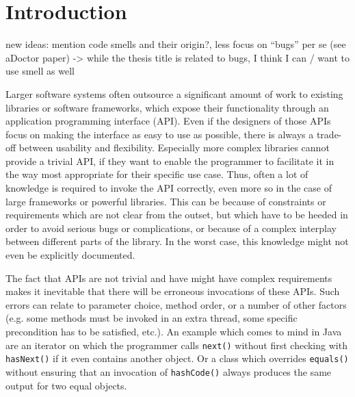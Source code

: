 \chapter{Introduction}\label{chapter:introduction}

new ideas:
    mention code smells and their origin?, less focus on ``bugs'' per se (see aDoctor paper) -> while the thesis title is related to bugs, I think I can / want to use smell as well 

Larger software systems often outsource a significant amount of work to existing libraries or software frameworks, which expose their functionality through an application programming interface (API).
Even if the designers of those APIs focus on making the interface as easy to use as possible, there is always a trade-off between usability and flexibility.
Especially more complex libraries cannot provide a trivial API, if they want to enable the programmer to facilitate it in the way most appropriate for their specific use case.
Thus, often a lot of knowledge is required to invoke the API correctly, even more so in the case of large frameworks or powerful libraries.
This can be because of constraints or requirements which are not clear from the outset, but which have to be heeded in order to avoid serious bugs or complications, or because of a complex interplay between different parts of the library.
In the worst case, this knowledge might not even be explicitly documented.

The fact that APIs are not trivial and have might have complex requirements makes it inevitable that there will be erroneous invocations of these APIs.
Such errors can relate to parameter choice, method order, or a number of other factors (e.g. some methods must be invoked in an extra thread, some specific precondition has to be satisfied, etc.).
An example which comes to mind in Java are an iterator on which the programmer calls \texttt{next()} without first checking with \texttt{hasNext()} if it even contains another object.
Or a class which overrides \texttt{equals()} without ensuring that an invocation of \texttt{hashCode()} always produces the same output for two equal objects.

